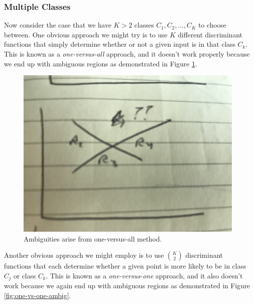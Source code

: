 
\subsubsection{Multiple Classes}
Now consider the case that we have $K > 2$ classes $C_{1}, C_{2}, ..., C_{K}$ to choose between. One obvious approach we might try is to use $K$ different discriminant functions that simply determine whether or not a given input is in that class $C_{k}$. This is known as a \textit{one-versus-all} approach, and it doesn't work properly because we end up with ambiguous regions as demonstrated in Figure \ref{fig:one-vs-all-ambig}.

\begin{figure}
    \centering
    \includegraphics[width=0.5\paperwidth]{../Classification/fig/one_vs_all_ambig.jpg}
    \caption{Ambiguities arise from one-versus-all method.}
    \label{fig:one-vs-all-ambig}
\end{figure}

Another obvious approach we might employ is to use $\binom{K}{2}$ discriminant functions that each determine whether a given point is more likely to be in class $C_{j}$ or class $C_{k}$. This is known as a \textit{one-versus-one} approach, and it also doesn't work because we again end up with ambiguous regions as demonstrated in Figure \ref{fig:one-vs-one-ambig}.

